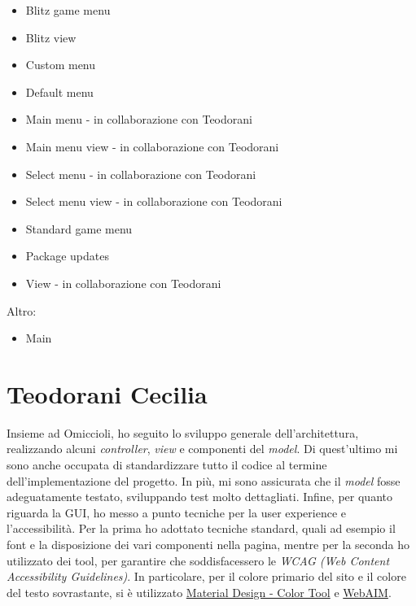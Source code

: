     \begin{itemize}
        \item Blitz game menu
        \item Blitz view
        \item Custom menu
        \item Default menu
        \item Main menu - in collaborazione con Teodorani
        \item Main menu view - in collaborazione con Teodorani
        \item Select menu - in collaborazione con Teodorani
        \item Select menu view - in collaborazione con Teodorani
        \item Standard game menu
        \item Package updates
        \item View - in collaborazione con Teodorani
    \end{itemize}
    Altro:
    \begin{itemize}
        \item Main
    \end{itemize}
    
\section{Teodorani Cecilia}
    Insieme ad Omiccioli, ho seguito lo sviluppo generale dell'architettura, realizzando alcuni \textit{controller}, \textit{view} e componenti del \textit{model}. Di quest'ultimo mi sono anche occupata di standardizzare tutto il codice al termine dell'implementazione del progetto. In più, mi sono assicurata che il \textit{model} fosse adeguatamente testato, sviluppando test molto dettagliati. Infine, per quanto riguarda la GUI, ho messo a punto tecniche per la user experience e l'accessibilità. Per la prima ho adottato tecniche standard, quali ad esempio il font e la disposizione dei vari componenti nella pagina, mentre per la seconda ho utilizzato dei tool, per garantire che soddisfacessero le \textit{WCAG (Web Content Accessibility Guidelines)}. In particolare, per il colore primario del sito e il colore del testo sovrastante, si è utilizzato \href{https://m2.material.io/resources/color/#!/?view.left=1&view.right=1&primary.color=8a171a&secondary.color=DEDEDE}{Material Design - Color Tool} e \href{https://webaim.org/resources/contrastchecker/?fcolor=DEDEDE&bcolor=8A171A}{WebAIM}.
    
